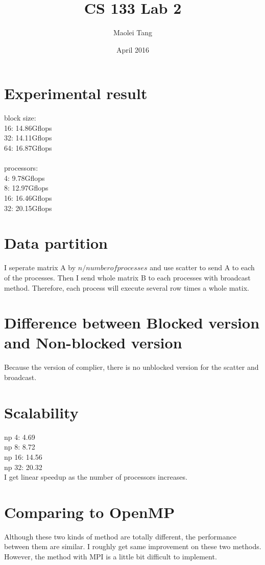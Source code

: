 \documentclass{article}
\title{CS 133 Lab 2}
\author{Maolei Tang}
\date{April 2016}
\begin{document}
\maketitle
\section*{Experimental result}
block size:\\
16:  14.86Gflops\\
32:  14.11Gflops\\
64:  16.87Gflops\\
\\
processors:\\
4: 9.78Gflops\\
8: 12.97Gflops\\
16: 16.46Gflops\\
32: 20.15Gflops\\

\section*{Data partition}
I seperate matrix A by $n/number of processes$ and use scatter to send A to each of the processes. Then I send whole matrix B to each processes with broadcast method. Therefore, each process will execute several row times a whole matix. \\
 
 
\section*{Difference between Blocked version and Non-blocked version}
Because the version of complier, there is no unblocked version for the scatter and broadcast.\\

\section*{Scalability}
np 4: 4.69\\
np 8: 8.72\\
np 16: 14.56\\
np 32: 20.32\\
I get linear speedup as the number of processors increases.\\

\section*{Comparing to OpenMP}
Although these two kinds of method are totally different, the performance between them are similar. I roughly get same improvement on these two methods. However, the method with MPI is a little bit difficult to implement.\\
\end{document}
